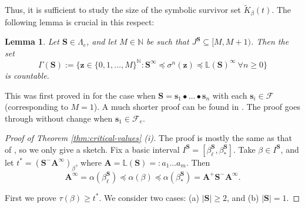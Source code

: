 \documentclass[12pt]{amsart}
\newtheorem{lemma}[theorem]{Lemma}
\theoremstyle{definition}
\theoremstyle{remark}
\numberwithin{equation}{section}
\newcommand{\N}{\ensuremath{\mathbb{N}}}
\renewcommand{\L}{\ensuremath{\mathbb{L}}}
\newcommand{\cF}{\mathcal{F}}
\newcommand{\s}{ {\mathbf{s}}}
\newcommand{\cs}{ {\mathbf{S}}}
\newcommand{\ca}{ {\mathbf{A}}}
\newcommand{\z}{\mathbf{z}}
\newcommand{\Ga}{\Gamma}
\newcommand{\f}{\infty}
\newcommand{\de}{\delta}
\newcommand{\al}{\alpha}
\newcommand{\lle}{\preccurlyeq}
\newcommand{\si}{\sigma}
\newcommand{\La}{\Lambda}
\begin{document}
{Thus, it is sufficient to study the size of the symbolic survivor set $\widetilde{K}_\beta(t)$. The following lemma is crucial in this respect:

\begin{lemma} \label{lem:countable}
Let $\cs\in\La_e$, and let $M\in\N$ be such that $J^\cs\subseteq [M,M+1)$. Then the set
\begin{equation} \label{eq:Gamma}
\Ga(\cs):=\{\z\in \{0,1,\dots,M\}^\N: \cs^\f\lle \sigma^n(\z)\lle \L(\cs)^\f\ \forall n\geq 0\}
\end{equation}
is countable.
\end{lemma}

This was first proved in \cite[Proposition 4.1]{Allaart-Kong-2021} for the case when $\cs=\s_1\bullet\dots\bullet \s_n$ with each $\s_i\in \cF$ (corresponding to $M=1$). A much shorter proof can be found in \cite[Lemma 7.3]{Allaart-Kong-2023}. The proof goes through without change when $\s_1\in \cF_e$.

\begin{proof}[Proof of Theorem \ref{thm:critical-values} (i)]
The proof is mostly the same as that of \cite[Theorem 2]{Allaart-Kong-2021}, so we only give a sketch.
Fix a basic interval $I^\cs=[\beta_\ell^\cs, \beta_*^\cs]$.
Take $\beta\in I^\cs$, and let $t^*=(\cs^-\ca^\f)_\beta$, where $\ca=\L(\cs)=:a_1\ldots a_m$.  Then %
\begin{equation}  \label{eq:alpha-range}
  \ca^\f=\al(\beta_\ell^\cs)\lle \al(\beta)\lle \al(\beta_*^\cs)=\ca^+\cs^-\ca^\f.
\end{equation}

First we prove $\tau(\beta)\ge t^*$. We consider two cases: (a) $|\cs|\geq 2$, and (b) $|\cs|=1$.


\end{proof}}
\end{document}
